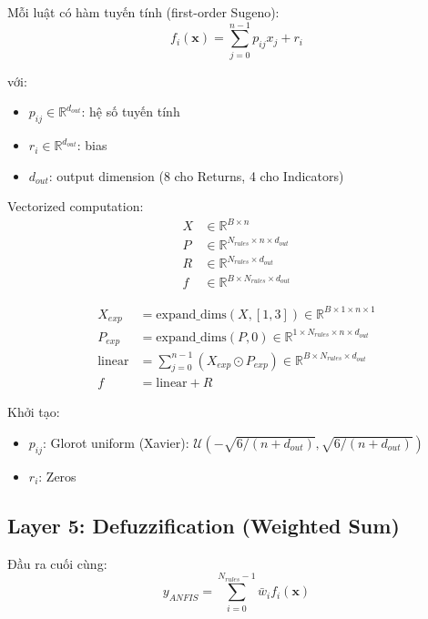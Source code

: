 \documentclass[12pt,a4paper]{article}
\begin{document}
Mỗi luật có hàm tuyến tính (first-order Sugeno):
\begin{equation}
f_i(\mathbf{x}) = \sum_{j=0}^{n-1} p_{ij} x_j + r_i
\end{equation}

với:
\begin{itemize}
    \item $p_{ij} \in \mathbb{R}^{d_{out}}$: hệ số tuyến tính
    \item $r_i \in \mathbb{R}^{d_{out}}$: bias
    \item $d_{out}$: output dimension (8 cho Returns, 4 cho Indicators)
\end{itemize}

Vectorized computation:
\begin{align}
X &\in \mathbb{R}^{B \times n} \\
P &\in \mathbb{R}^{N_{rules} \times n \times d_{out}} \\
R &\in \mathbb{R}^{N_{rules} \times d_{out}} \\
f &\in \mathbb{R}^{B \times N_{rules} \times d_{out}}
\end{align}

\begin{align}
X_{exp} &= \text{expand\_dims}(X, [1, 3]) \in \mathbb{R}^{B \times 1 \times n \times 1} \\
P_{exp} &= \text{expand\_dims}(P, 0) \in \mathbb{R}^{1 \times N_{rules} \times n \times d_{out}} \\
\text{linear} &= \sum_{j=0}^{n-1} (X_{exp} \odot P_{exp}) \in \mathbb{R}^{B \times N_{rules} \times d_{out}} \\
f &= \text{linear} + R
\end{align}

Khởi tạo:
\begin{itemize}
    \item $p_{ij}$: Glorot uniform (Xavier): $\mathcal{U}(-\sqrt{6/(n+d_{out})}, \sqrt{6/(n+d_{out})})$
    \item $r_i$: Zeros
\end{itemize}

\subsection{Layer 5: Defuzzification (Weighted Sum)}

Đầu ra cuối cùng:
\begin{equation}
y_{ANFIS} = \sum_{i=0}^{N_{rules}-1} \bar{w}_i f_i(\mathbf{x})
\end{equation}
\end{document}

